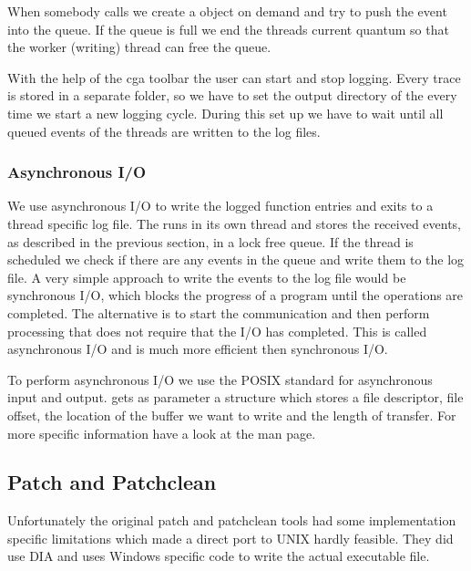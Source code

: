 When somebody calls  we create a  object on demand and try to push the event into the queue. If the queue is full we end the threads current quantum so that the worker (writing) thread can free the queue.

With the help of the cga toolbar the user can start and stop logging. Every trace is stored in a separate folder, so we have to set the output directory of the  every time we start a new logging cycle. During this set up we have to wait until all queued events of the threads are written to the log files.

\subsubsection{Asynchronous I/O}

We use asynchronous I/O to write the logged function entries and exits to a thread specific log file. The  runs in its own thread and stores the received events, as described in the previous section, in a lock free queue. If the  thread is scheduled we check if there are any events in the queue and write them to the log file. A very simple approach to write the events to the log file would be synchronous I/O, which blocks the progress of a program until the operations are completed. The alternative is to start the communication and then perform processing that does not require that the I/O has completed. This is called asynchronous I/O and is much more efficient then synchronous I/O.

To perform asynchronous I/O we use the POSIX standard for asynchronous input and output.  gets as parameter a  structure which stores a file descriptor, file offset, the location of the buffer we want to write and the length of transfer. For more specific information have a look at the  man page.

\subsection{Patch and Patchclean}

Unfortunately the original patch and patchclean tools had some implementation specific limitations which made a direct port to UNIX hardly feasible.  They did use DIA and  uses Windows specific code to write the actual executable file.

